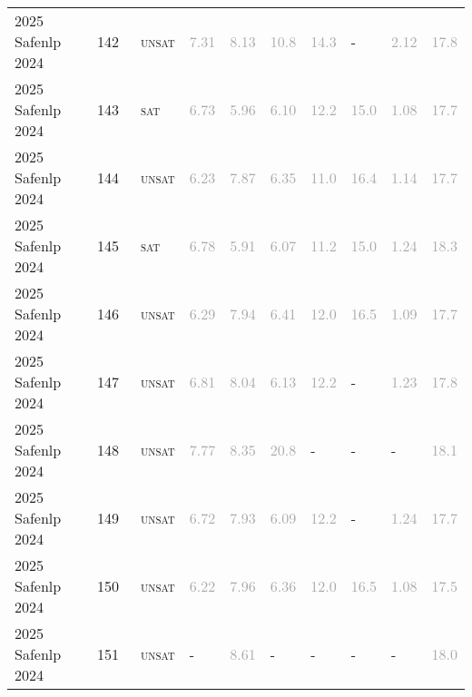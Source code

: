 \begin{center}
{\begin{longtable}{@{}llllllllll@{}}
2025 Safenlp 2024 & 142 & ~\textsc{unsat} & \textcolor{darkgray}{7.31} & \textcolor{darkgray}{8.13} & \textcolor{darkgray}{10.8} & \textcolor{darkgray}{14.3} & - & \textcolor{darkgray}{2.12} & \textcolor{darkgray}{17.8} \\
2025 Safenlp 2024 & 143 & ~\textsc{sat} & \textcolor{darkgray}{6.73} & \textcolor{darkgray}{5.96} & \textcolor{darkgray}{6.10} & \textcolor{darkgray}{12.2} & \textcolor{darkgray}{15.0} & \textcolor{darkgray}{1.08} & \textcolor{darkgray}{17.7} \\
2025 Safenlp 2024 & 144 & ~\textsc{unsat} & \textcolor{darkgray}{6.23} & \textcolor{darkgray}{7.87} & \textcolor{darkgray}{6.35} & \textcolor{darkgray}{11.0} & \textcolor{darkgray}{16.4} & \textcolor{darkgray}{1.14} & \textcolor{darkgray}{17.7} \\
2025 Safenlp 2024 & 145 & ~\textsc{sat} & \textcolor{darkgray}{6.78} & \textcolor{darkgray}{5.91} & \textcolor{darkgray}{6.07} & \textcolor{darkgray}{11.2} & \textcolor{darkgray}{15.0} & \textcolor{darkgray}{1.24} & \textcolor{darkgray}{18.3} \\
2025 Safenlp 2024 & 146 & ~\textsc{unsat} & \textcolor{darkgray}{6.29} & \textcolor{darkgray}{7.94} & \textcolor{darkgray}{6.41} & \textcolor{darkgray}{12.0} & \textcolor{darkgray}{16.5} & \textcolor{darkgray}{1.09} & \textcolor{darkgray}{17.7} \\
2025 Safenlp 2024 & 147 & ~\textsc{unsat} & \textcolor{darkgray}{6.81} & \textcolor{darkgray}{8.04} & \textcolor{darkgray}{6.13} & \textcolor{darkgray}{12.2} & - & \textcolor{darkgray}{1.23} & \textcolor{darkgray}{17.8} \\
2025 Safenlp 2024 & 148 & ~\textsc{unsat} & \textcolor{darkgray}{7.77} & \textcolor{darkgray}{8.35} & \textcolor{darkgray}{20.8} & - & - & - & \textcolor{darkgray}{18.1} \\
2025 Safenlp 2024 & 149 & ~\textsc{unsat} & \textcolor{darkgray}{6.72} & \textcolor{darkgray}{7.93} & \textcolor{darkgray}{6.09} & \textcolor{darkgray}{12.2} & - & \textcolor{darkgray}{1.24} & \textcolor{darkgray}{17.7} \\
2025 Safenlp 2024 & 150 & ~\textsc{unsat} & \textcolor{darkgray}{6.22} & \textcolor{darkgray}{7.96} & \textcolor{darkgray}{6.36} & \textcolor{darkgray}{12.0} & \textcolor{darkgray}{16.5} & \textcolor{darkgray}{1.08} & \textcolor{darkgray}{17.5} \\
2025 Safenlp 2024 & 151 & ~\textsc{unsat} & - & \textcolor{darkgray}{8.61} & - & - & - & - & \textcolor{darkgray}{18.0} \\

\end{longtable}}
\end{center}
